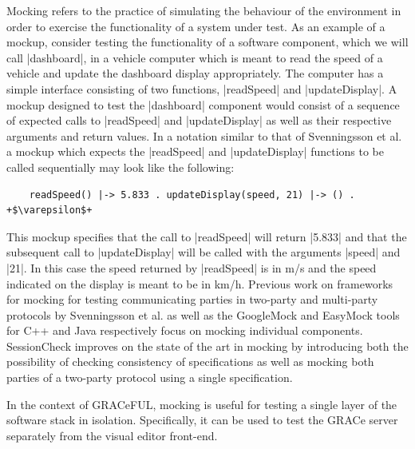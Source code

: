 \documentclass{article}
\begin{document}
Mocking refers to the practice of simulating the behaviour of the
environment in order to exercise the functionality of a system under
test.
%
As an example of a mockup, consider testing the functionality of a software
component, which we will call |dashboard|, in a vehicle computer which is
meant to read the speed of a vehicle and update the dashboard display
appropriately.
%
The computer has a simple interface consisting of two functions,
|readSpeed| and |updateDisplay|.
%
A mockup designed to test the |dashboard| component would consist of a sequence
of expected calls to |readSpeed| and |updateDisplay| as well as their
respective arguments and return values.
%
In a notation similar to that of Svenningsson et al. \cite{HughesMocking}
a mockup which expects the |readSpeed| and |updateDisplay| functions to be
called sequentially may look like the following:
%
\begin{verbatim}
    readSpeed() |-> 5.833 . updateDisplay(speed, 21) |-> () . +$\varepsilon$+
\end{verbatim}
%
This mockup specifies that the call to |readSpeed| will return |5.833| and that
the subsequent call to |updateDisplay| will be called with the arguments
|speed| and |21|.
%
In this case the speed returned by |readSpeed| is in m/s and the speed indicated
on the display is meant to be in km/h.
%
Previous work on frameworks for mocking for testing communicating parties
in two-party and multi-party protocols by Svenningsson et al. \cite{HughesMocking}
as well as the GoogleMock \cite{GoogleMock} and EasyMock \cite{EasyMock} tools
for C++ and Java respectively focus on mocking individual components.
%
SessionCheck improves on the state of the art in mocking by introducing
both the possibility of checking consistency of specifications as well as
mocking both parties of a two-party protocol using a single specification.
%

In the context of GRACeFUL, mocking is useful for testing a single
layer of the software stack in isolation.
%
Specifically, it can be used to test the GRACe server separately from
the visual editor front-end.
\end{document}
